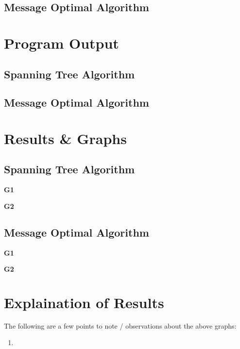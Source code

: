 \documentclass[a4paper,12pt]{report}
\begin{document}
\subsection{Message Optimal Algorithm}
\newpage
\section{Program Output}
\subsection{Spanning Tree Algorithm}
\subsection{Message Optimal Algorithm}
\newpage
\section{Results \& Graphs}
\subsection{Spanning Tree Algorithm}
\begin{center}
\begin{large}
\textbf{G1}\\
\end{large}
\end{center}
\begin{center}
\begin{large}
\textbf{G2}\\
\end{large}
\end{center}
\subsection{Message Optimal Algorithm}
\begin{center}
\begin{large}
\textbf{G1}\\
\end{large}
\end{center}
\begin{center}
\begin{large}
\textbf{G2}\\
\end{large}
\end{center}

\section{Explaination of Results}
The following are a few points to note / observations about the above graphs:
\begin{enumerate}
\item
\end{enumerate}
\end{document}
